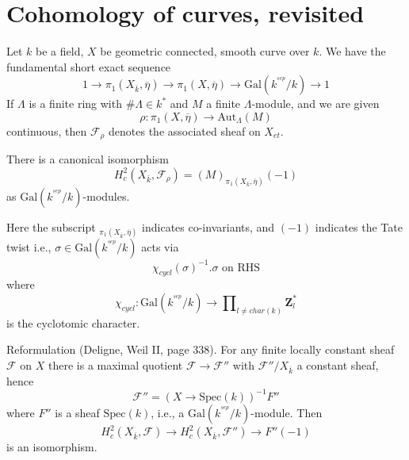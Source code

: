 \section{Cohomology of curves, revisited}
\label{section-cohomology-curves-revisited}

\noindent
Let $k$ be a field, $X$ be geometric connected, smooth curve over $k$.
We have the fundamental short exact sequence
$$
1 \to
\pi_1(X_{\overline k}, \overline \eta) \to
\pi_1(X, \overline\eta) \to
\text{Gal}(k^{^{sep}}/k) \to 1
$$
If $\Lambda$ is a finite ring with $\#\Lambda\in k^*$ and $M$ a finite
$\Lambda$-module, and we are given
$$
\rho:\pi_1(X, \overline\eta) \to \text{Aut}_{\Lambda}(M)
$$
continuous, then $\mathcal{F}_\rho$ denotes the associated sheaf on $X_{et}$.

\begin{lemma}
\label{lemma-identify-h2c}
There is a canonical isomorphism
$$
H_c^2(X_{\overline k}, \mathcal{F}_\rho)=(M)_{\pi_1(X_{\overline k},
\overline\eta)}(-1)
$$
as $\text{Gal}(k^{^{sep}}/k)$-modules.
\end{lemma}

\noindent
Here the subscript ${}_{\pi_1(X_{\overline k}, \overline\eta)}$
indicates co-invariants, and $(-1)$ indicates the Tate twist i.e.,
$\sigma\in \text{Gal}(k^{^{sep}}/k)$ acts via
$$
\chi_{cycl}(\sigma)^{-1}.\sigma\text{ on RHS}
$$
where
$$
\chi_{cycl} :
\text{Gal}(k^{^{sep}}/k)
\to
\prod\nolimits_{l\neq char(k)}\mathbf{Z}_l^*
$$
is the cyclotomic character.

\medskip\noindent
Reformulation (Deligne, Weil II, page 338). For any finite locally
constant sheaf $\mathcal{F}$ on $X$ there is a maximal quotient $\mathcal{F}\to
\mathcal{F}''$ with $\mathcal{F}''/X_{\overline k}$ a constant sheaf, hence
$$
\mathcal{F}'' = (X\to \text{Spec}(k))^{-1}F''
$$
where $F''$ is a sheaf $\text{Spec}(k)$, i.e., a
$\text{Gal}(k^{^{sep}}/k)$-module. Then
$$
H_c^2(X_{\overline k}, \mathcal{F})\to H_c^2(X_{\overline k},
\mathcal{F}'')\to F''(-1)
$$
is an isomorphism.

